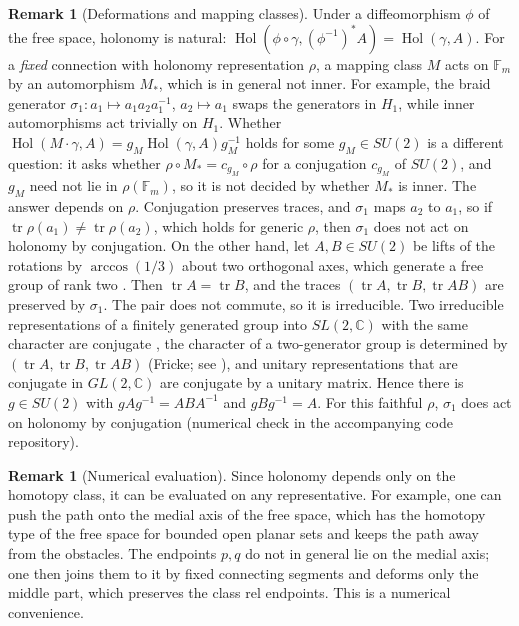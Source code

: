 \documentclass[11pt,reqno]{amsart}
\theoremstyle{definition}
\newtheorem{remark}[theorem]{Remark}
\numberwithin{equation}{section}
\begin{document}
\begin{remark}[Deformations and mapping classes]
Under a diffeomorphism $\phi$ of the free space, holonomy is natural: $\operatorname{Hol}(\phi \circ \gamma, (\phi^{-1})^*A) = \operatorname{Hol}(\gamma, A)$. For a \emph{fixed} connection with holonomy representation $\rho$, a mapping class $M$ acts on $\mathbb{F}_m$ by an automorphism $M_*$, which is in general not inner. For example, the braid generator $\sigma_1 \colon a_1 \mapsto a_1 a_2 a_1^{-1}$, $a_2 \mapsto a_1$ swaps the generators in $H_1$, while inner automorphisms act trivially on $H_1$. Whether $\operatorname{Hol}(M\cdot\gamma, A) = g_M \operatorname{Hol}(\gamma, A) g_M^{-1}$ holds for some $g_M \in SU(2)$ is a different question: it asks whether $\rho \circ M_* = c_{g_M} \circ \rho$ for a conjugation $c_{g_M}$ of $SU(2)$, and $g_M$ need not lie in $\rho(\mathbb{F}_m)$, so it is not decided by whether $M_*$ is inner. The answer depends on $\rho$. Conjugation preserves traces, and $\sigma_1$ maps $a_2$ to $a_1$, so if $\operatorname{tr}\rho(a_1) \ne \operatorname{tr}\rho(a_2)$, which holds for generic $\rho$, then $\sigma_1$ does not act on holonomy by conjugation. On the other hand, let $A, B \in SU(2)$ be lifts of the rotations by $\arccos(1/3)$ about two orthogonal axes, which generate a free group of rank two \cite{swierczkowski1958}. Then $\operatorname{tr}A = \operatorname{tr}B$, and the traces $(\operatorname{tr}A, \operatorname{tr}B, \operatorname{tr}AB)$ are preserved by $\sigma_1$. The pair does not commute, so it is irreducible. Two irreducible representations of a finitely generated group into $SL(2,\mathbb{C})$ with the same character are conjugate \cite{culler1983}, the character of a two-generator group is determined by $(\operatorname{tr}A, \operatorname{tr}B, \operatorname{tr}AB)$ (Fricke; see \cite{goldman2009trace}), and unitary representations that are conjugate in $GL(2,\mathbb{C})$ are conjugate by a unitary matrix. Hence there is $g \in SU(2)$ with $gAg^{-1} = ABA^{-1}$ and $gBg^{-1} = A$. For this faithful $\rho$, $\sigma_1$ does act on holonomy by conjugation (numerical check in the accompanying code repository).
\end{remark}

\begin{remark}[Numerical evaluation]
Since holonomy depends only on the homotopy class, it can be evaluated on any representative. For example, one can push the path onto the medial axis of the free space, which has the homotopy type of the free space for bounded open planar sets \cite{lieutier2004} and keeps the path away from the obstacles. The endpoints $p, q$ do not in general lie on the medial axis; one then joins them to it by fixed connecting segments and deforms only the middle part, which preserves the class rel endpoints. This is a numerical convenience.
\end{remark}
\end{document}

